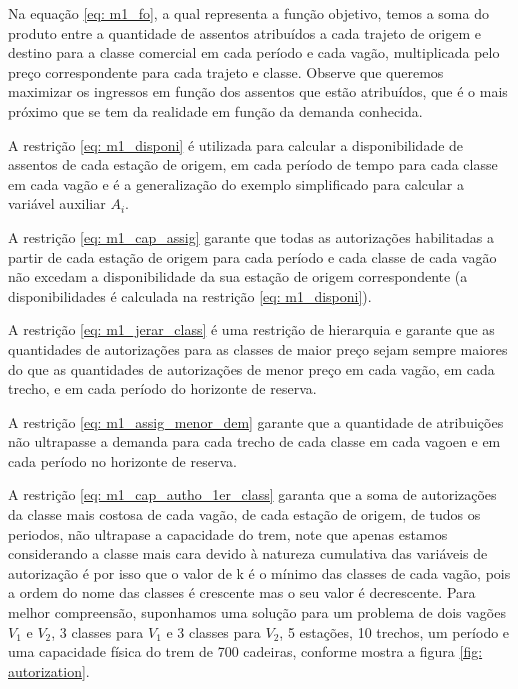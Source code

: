 Na equação \ref{eq: m1_fo}, a qual representa a função objetivo, temos a soma do produto entre a quantidade de assentos atribuídos a cada trajeto de origem e destino para a classe comercial em cada período e cada vagão, multiplicada pelo preço correspondente para cada trajeto e classe. Observe que queremos maximizar os ingressos em função dos assentos que estão atribuídos, que é o mais próximo que se tem da realidade em função da demanda conhecida.

A restrição \ref{eq: m1_disponi} é utilizada para calcular a disponibilidade de assentos de cada estação de origem, em cada período de tempo para cada classe em cada vagão e é a generalização do exemplo simplificado para calcular a variável auxiliar $A_i$.

A restrição \ref{eq: m1_cap_assig} garante que todas as autorizações habilitadas a partir de cada estação de origem para cada período e cada classe de cada vagão não excedam a disponibilidade da sua estação de origem correspondente (a disponibilidades é calculada na restrição \ref{eq: m1_disponi}).

A restrição \ref{eq: m1_jerar_class} é uma restrição de hierarquia e garante que as quantidades de autorizações para as classes de maior preço sejam sempre maiores do que as quantidades de autorizações de menor preço em cada vagão, em cada trecho, e em  cada período do horizonte de reserva.

A restrição \ref{eq: m1_assig_menor_dem} garante que a quantidade de atribuições não ultrapasse a demanda para cada trecho de cada classe em cada vagoen e em cada período no horizonte de reserva.

A restrição \ref{eq: m1_cap_autho_1er_class} garanta que a soma de autorizações da classe mais costosa de cada vagão, de cada estação de origem, de tudos os periodos, não ultrapase a capacidade do trem, note que apenas estamos considerando a classe mais cara devido à natureza cumulativa das variáveis de autorização é por isso que o valor de k é o mínimo das classes de cada vagão, pois a ordem do nome das classes é crescente mas o seu valor é decrescente. Para melhor compreensão, suponhamos uma solução para um problema de dois vagões $V_1$ e $V_2$, 3 classes para $V_1$ e 3 classes para $V_2$, 5 estações,  10 trechos, um período e uma capacidade física do trem de 700 cadeiras, conforme mostra a figura \ref{fig: autorization}.

